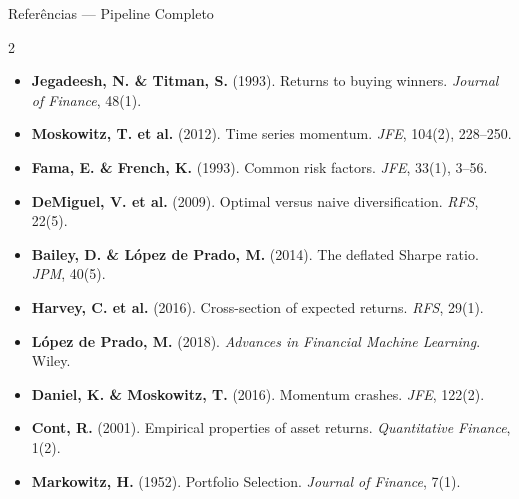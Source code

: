 \documentclass[aspectratio=169,12pt]{beamer}
\begin{document}
\begin{frame}[fragile]{Referências — Pipeline Completo}
\begin{multicols}{2}
\tiny
\begin{itemize}
  \item \textbf{Jegadeesh, N. \& Titman, S.} (1993). Returns to buying winners. \textit{Journal of Finance}, 48(1).
  \item \textbf{Moskowitz, T. et al.} (2012). Time series momentum. \textit{JFE}, 104(2), 228--250.
  \item \textbf{Fama, E. \& French, K.} (1993). Common risk factors. \textit{JFE}, 33(1), 3--56.
  \item \textbf{DeMiguel, V. et al.} (2009). Optimal versus naive diversification. \textit{RFS}, 22(5).
  \item \textbf{Bailey, D. \& López de Prado, M.} (2014). The deflated Sharpe ratio. \textit{JPM}, 40(5).
  \item \textbf{Harvey, C. et al.} (2016). Cross-section of expected returns. \textit{RFS}, 29(1).
  \item \textbf{López de Prado, M.} (2018). \textit{Advances in Financial Machine Learning}. Wiley.
  \item \textbf{Daniel, K. \& Moskowitz, T.} (2016). Momentum crashes. \textit{JFE}, 122(2).
  \item \textbf{Cont, R.} (2001). Empirical properties of asset returns. \textit{Quantitative Finance}, 1(2).
  \item \textbf{Markowitz, H.} (1952). Portfolio Selection. \textit{Journal of Finance}, 7(1).
\end{itemize}
\end{multicols}
\end{frame}
\end{document}
